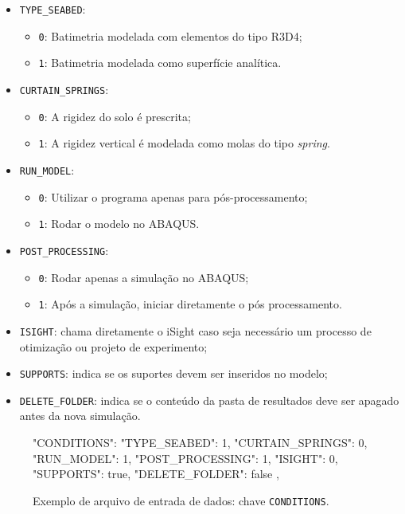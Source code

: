 \begin{itemize}
  \item \texttt{TYPE\_SEABED}:
  \begin{itemize}
    \item \texttt{0}: Batimetria modelada com elementos do tipo R3D4;
    \item \texttt{1}: Batimetria modelada como superfície analítica.
  \end{itemize}
  \item  \texttt{CURTAIN\_SPRINGS}:
    \begin{itemize}
      \item \texttt{0}: A rigidez do solo é prescrita;
      \item \texttt{1}: A rigidez vertical é modelada como molas do tipo \textit{spring}.
    \end{itemize}
  \item \texttt{RUN\_MODEL}:
    \begin{itemize}
      \item \texttt{0}: Utilizar o programa apenas para pós-processamento;
      \item \texttt{1}: Rodar o modelo no ABAQUS.
    \end{itemize}
  \item \texttt{POST\_PROCESSING}:
    \begin{itemize}
      \item \texttt{0}: Rodar apenas a simulação no ABAQUS;
      \item \texttt{1}: Após a simulação, iniciar diretamente o pós processamento.
    \end{itemize}
  \item \texttt{ISIGHT}: chama diretamente o iSight caso seja necessário um processo de otimização ou projeto de experimento\@;
  \item \texttt{SUPPORTS}: indica se os suportes devem ser inseridos no modelo;
  \item \texttt{DELETE\_FOLDER}: indica se o conteúdo da pasta de resultados deve ser apagado antes da nova simulação.
\end{itemize}

\begin{figure}
\caption{Exemplo de arquivo de entrada de dados: chave \texttt{CONDITIONS}.\label{lst:conditions}}
\begin{jsoncode}
{
  "CONDITIONS": {
    "TYPE_SEABED": 1,
    "CURTAIN_SPRINGS": 0,
    "RUN_MODEL": 1,
    "POST_PROCESSING": 1,
    "ISIGHT": 0,
    "SUPPORTS": true,
    "DELETE_FOLDER": false
  },
}
\end{jsoncode}
\end{figure}

